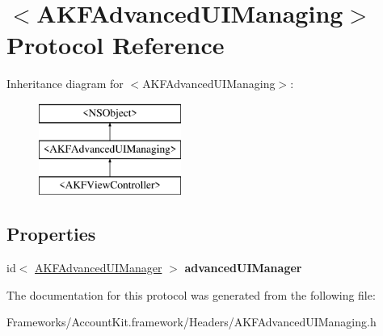 \hypertarget{protocol_a_k_f_advanced_u_i_managing-p}{}\section{$<$A\+K\+F\+Advanced\+U\+I\+Managing$>$ Protocol Reference}
\label{protocol_a_k_f_advanced_u_i_managing-p}
Inheritance diagram for $<$A\+K\+F\+Advanced\+U\+I\+Managing$>$\+:\begin{figure}[H]
\begin{center}
\leavevmode
\includegraphics[height=3.000000cm]{protocol_a_k_f_advanced_u_i_managing-p}
\end{center}
\end{figure}
\subsection*{Properties}
\begin{DoxyCompactItemize}
\item 
\hypertarget{protocol_a_k_f_advanced_u_i_managing-p_a0b731bf5e1a51ee3cd7cd34288f68351}{}id$<$ \hyperlink{protocol_a_k_f_advanced_u_i_manager-p}{A\+K\+F\+Advanced\+U\+I\+Manager} $>$ {\bfseries advanced\+U\+I\+Manager}\label{protocol_a_k_f_advanced_u_i_managing-p_a0b731bf5e1a51ee3cd7cd34288f68351}

\end{DoxyCompactItemize}


The documentation for this protocol was generated from the following file\+:\begin{DoxyCompactItemize}
\item 
Frameworks/\+Account\+Kit.\+framework/\+Headers/A\+K\+F\+Advanced\+U\+I\+Managing.\+h\end{DoxyCompactItemize}
